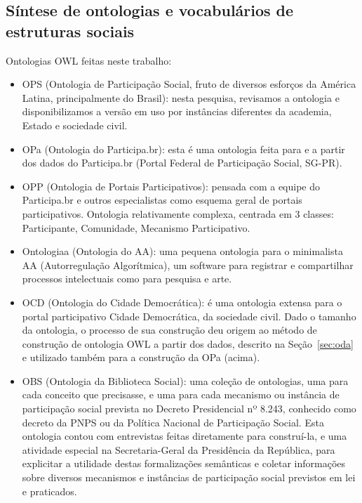 \documentclass[a4paper,openright,12pt]{report} %
\begin{document}
\subsection{Síntese de ontologias e vocabulários de estruturas sociais}
Ontologias OWL feitas neste trabalho:
\begin{itemize}
	\item OPS (Ontologia de Participação Social, fruto de diversos esforços da América Latina, principalmente do Brasil): nesta pesquisa, revisamos a ontologia e disponibilizamos a versão em uso por instâncias diferentes da academia, Estado e sociedade civil.~\cite{ops}
        \item OPa (Ontologia do Participa.br): esta é uma ontologia feita para e a partir dos dados do Participa.br (Portal Federal de Participação Social, SG-PR).
        \item OPP (Ontologia de Portais Participativos): pensada com a equipe do Participa.br e outros especialistas como esquema geral de portais participativos. Ontologia relativamente complexa, centrada em 3 classes: Participante, Comunidade, Mecanismo Participativo.
        \item Ontologiaa (Ontologia do AA): uma pequena ontologia para o minimalista AA (Autorregulação Algorítmica), um software para registrar e compartilhar processos intelectuais como para pesquisa e arte.~\cite{pnud5,paaper,ensaaio}
        \item OCD (Ontologia do Cidade Democrática): é uma ontologia extensa para o portal participativo Cidade Democrática, da sociedade civil. Dado o tamanho da ontologia, o processo de sua construção deu origem ao método de construção de ontologia OWL a partir dos dados, descrito na Seção~\ref{sec:oda} e utilizado também para a construção da OPa (acima).
        \item OBS (Ontologia da Biblioteca Social): uma coleção de ontologias, uma para cada conceito que precisasse, e uma para cada mecanismo ou instância de participação social prevista no Decreto Presidencial nº 8.243, conhecido como decreto da PNPS ou da Política Nacional de Participação Social. Esta ontologia contou com entrevistas feitas diretamente para construí-la,	e uma atividade especial na Secretaria-Geral da
Presidência da República, para explicitar a utilidade
destas formalizações semânticas e coletar informações sobre
diversos mecanismos e instâncias de participação social previstos
em lei e praticados.~\cite{pnud5}
\end{itemize}
\end{document}
